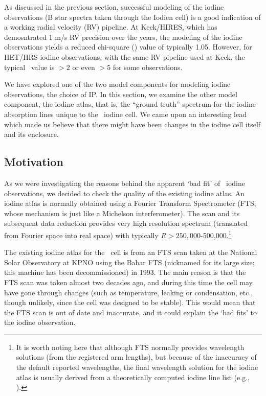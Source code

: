 
As discussed in the previous section, successful modeling of the
iodine observations (B star spectra taken through the Iodien cell) is
a good indication of a working radial velocity (RV) pipeline. At
Keck/HIRES, which has demosntrated 1 m/s RV precision over the years,
the modeling of the iodine observations yields a reduced chi-square
(\chisq) value of typically 1.05. However, for HET/HRS iodine
observations, with the same RV pipeline used at Keck, the typical
\chisq\ value is $>2$ or even $>5$ for some observations. 

We have explored one of the two model components for modeling iodine
observations, the choice of IP. In this section, we examine the other
model component, the iodine atlas, that is, the ``ground truth''
spectrum for the iodine absorption lines unique to the \het\ iodine
cell. We came upon an interesting lead which made us believe that
there might have been changes in the iodine cell itself and its
enclosure.


\subsection{Motivation}

As we were investigating the reasons behind the apparent `bad fit' of
\het\ iodine observations, we decided to check the quality of the
existing iodine atlas. An iodine atlas is normally obtained using a
Fourier Transform Spectrometer (FTS; whose mechanism is just like a
Michelson interferometer). The scan and its subsequent data reduction
provides very high resolution spectrum (translated from Fourier space
into real space) with typically $R > 250,000$-500,000.\footnote{It is worth
noting here that although FTS normally provides wavelength solutions
(from the registered arm lengths), but because of the inaccuracy of
the default reported wavelengths, the final wavelength solution for
the iodine atlas is usually derived from a theoretically computed iodine
line list (e.g., \citealt{iodinespec5}).}

The existing iodine atlas for the \het\ cell is from an FTS scan taken
at the National Solar Observatory at KPNO using the Babar FTS
(nicknamed for its large size; this machine has been decommissioned)
in 1993. The main reason is that the FTS scan was taken almost two
decades ago, and during this time the cell may have gone through
changes (such as temperature, leaking or condensation, etc., though
unlikely, since the cell was designed to be stable). This would mean
that the FTS scan is out of date and inaccurate, and it could explain
the `bad fits' to the iodine observation.

